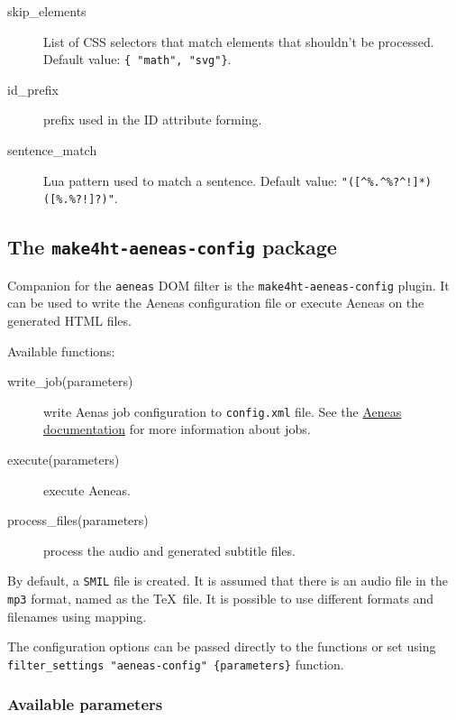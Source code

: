 \begin{description}
\item[skip\_elements]
List of CSS selectors that match elements that shouldn't be processed.
Default value: \texttt{\{\ "math",\ "svg"\}}.
\item[id\_prefix]
prefix used in the ID attribute forming.
\item[sentence\_match]
Lua pattern used to match a sentence. Default value:
\texttt{"({[}\^{}\%.\^{}\%?\^{}!{]}*)({[}\%.\%?!{]}?)"}.
\end{description}

\subsection{\texorpdfstring{The \texttt{make4ht-aeneas-config}
package}{The make4ht-aeneas-config package}}\label{the-make4ht-aeneas-config-package}

Companion for the \texttt{aeneas} DOM filter is the
\texttt{make4ht-aeneas-config} plugin. It can be used to write the
Aeneas configuration file or execute Aeneas on the generated HTML files.

Available functions:

\begin{description}
\item[write\_job(parameters)]
write Aenas job configuration to \texttt{config.xml} file. See the
\href{https://www.readbeyond.it/aeneas/docs/clitutorial.html\#processing-jobs}{Aeneas
documentation} for more information about jobs.
\item[execute(parameters)]
execute Aeneas.
\item[process\_files(parameters)]
process the audio and generated subtitle files.
\end{description}

By default, a \texttt{SMIL} file is created. It is assumed that there is
an audio file in the \texttt{mp3} format, named as the \TeX~file. It is
possible to use different formats and filenames using mapping.

The configuration options can be passed directly to the functions or set
using \texttt{filter\_settings\ "aeneas-config"\ \{parameters\}}
function.

\subsubsection{Available parameters}\label{available-parameters}

